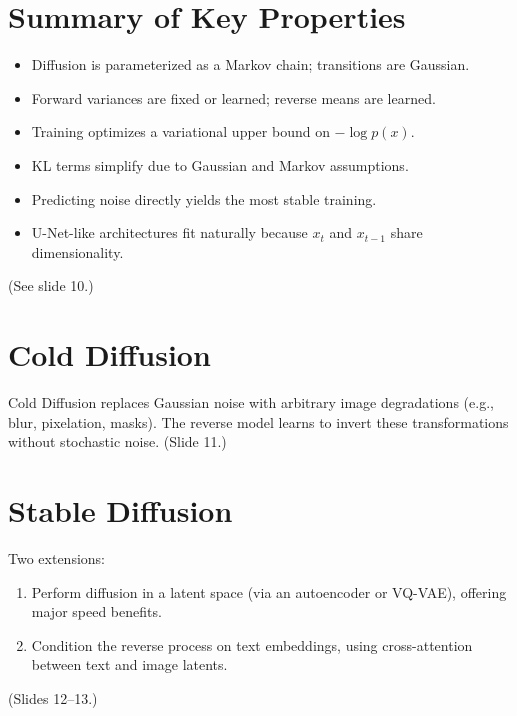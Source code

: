 \documentclass[12pt]{article}
\begin{document}
\section{Summary of Key Properties}
\begin{itemize}
		\item Diffusion is parameterized as a Markov chain; transitions are Gaussian.
		\item Forward variances are fixed or learned; reverse means are learned.
		\item Training optimizes a variational upper bound on $-\log p(x)$.
		\item KL terms simplify due to Gaussian and Markov assumptions.
		\item Predicting noise directly yields the most stable training.
		\item U-Net-like architectures fit naturally because $x_t$ and $x_{t-1}$ share dimensionality.
\end{itemize}
(See slide 10.)

\section{Cold Diffusion}
Cold Diffusion replaces Gaussian noise with arbitrary image degradations (e.g., blur, pixelation, masks).
The reverse model learns to invert these transformations without stochastic noise.
(Slide 11.)

\section{Stable Diffusion}
Two extensions:
\begin{enumerate}
		\item Perform diffusion in a latent space (via an autoencoder or VQ-VAE), offering major speed benefits.
		\item Condition the reverse process on text embeddings, using cross-attention between text and image latents.
\end{enumerate}
(Slides 12--13.)
\end{document}

